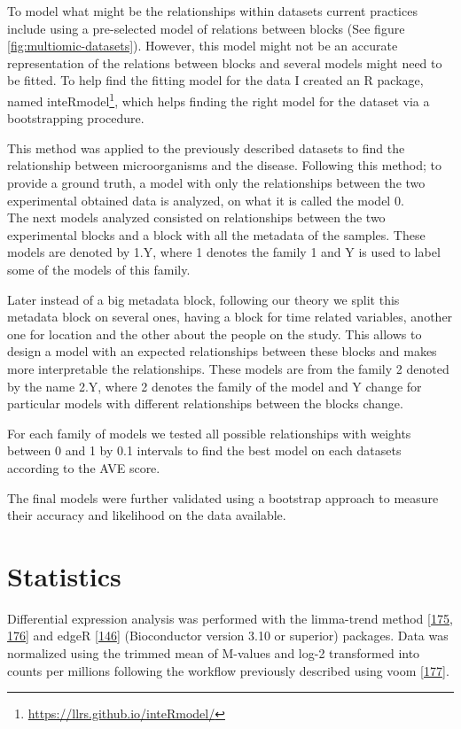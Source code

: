 \documentclass[
  a4paper,
]{book}
\DeclareRobustCommand{\href}[2]{#2\footnote{\url{#1}}}
\begin{document}
To model what might be the relationships within datasets current practices include using a pre-selected model of relations between blocks (See figure \ref{fig:multiomic-datasets}).
However, this model might not be an accurate representation of the relations between blocks and several models might need to be fitted.
To help find the fitting model for the data I created an R package, named \href{https://llrs.github.io/inteRmodel/}{inteRmodel}, which helps finding the right model for the dataset via a bootstrapping procedure.

This method was applied to the previously described datasets to find the relationship between microorganisms and the disease.
Following this method; to provide a ground truth, a model with only the relationships between the two experimental obtained data is analyzed, on what it is called the model 0.\\
The next models analyzed consisted on relationships between the two experimental blocks and a block with all the metadata of the samples.
These models are denoted by 1.Y, where 1 denotes the family 1 and Y is used to label some of the models of this family.

Later instead of a big metadata block, following our theory we split this metadata block on several ones, having a block for time related variables, another one for location and the other about the people on the study.
This allows to design a model with an expected relationships between these blocks and makes more interpretable the relationships.
These models are from the family 2 denoted by the name 2.Y, where 2 denotes the family of the model and Y change for particular models with different relationships between the blocks change.

For each family of models we tested all possible relationships with weights between 0 and 1 by 0.1 intervals to find the best model on each datasets according to the AVE score.

The final models were further validated using a bootstrap approach to measure their accuracy and likelihood on the data available.

\hypertarget{statistics}{%
\section{Statistics}\label{statistics}}

Differential expression analysis was performed with the limma-trend method {[}\protect\hyperlink{ref-ritchie2015}{175}, \protect\hyperlink{ref-law2014}{176}{]} and edgeR {[}\protect\hyperlink{ref-mccarthy2012}{146}{]} (Bioconductor version 3.10 or superior) packages.
Data was normalized using the trimmed mean of M-values and log-2 transformed into counts per millions following the workflow previously described using voom {[}\protect\hyperlink{ref-law2018}{177}{]}.
\end{document}
